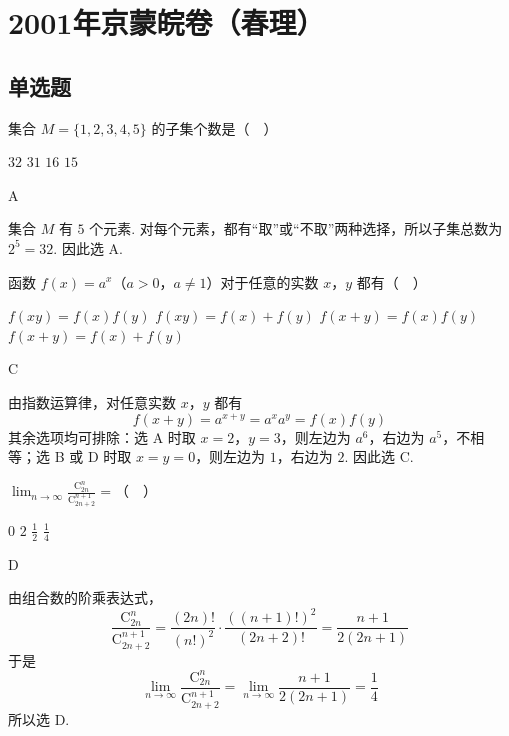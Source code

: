 \chapter{2001年京蒙皖卷（春理）}
\section{单选题}
\begin{problem}
集合 \(M = \{1, 2, 3, 4, 5\}\) 的子集个数是（\(\quad\)）

\choices
    {\(32\)}
    {\(31\)}
    {\(16\)}
    {\(15\)}
\end{problem}

\begin{answer}
A
\end{answer}

\begin{solution}
集合 \(M\) 有 \(5\) 个元素. 对每个元素，都有“取”或“不取”两种选择，所以子集总数为 \(2^{5}=32\). 因此选 A.
\end{solution}

\begin{problem}
函数 \(f(x)=a^x\)（\(a>0\)，\(a\neq1\)）对于任意的实数 \(x\)，\(y\) 都有（\(\quad\)）

\choices
    {\(f(xy) = f(x)f(y)\)}
    {\(f(xy) = f(x) + f(y)\)}
    {\(f(x + y) = f(x)f(y)\)}
    {\(f(x + y) = f(x) + f(y)\)}
\end{problem}

\begin{answer}
C
\end{answer}

\begin{solution}
由指数运算律，对任意实数 \(x\)，\(y\) 都有
\[
f(x+y)=a^{x+y}=a^xa^y=f(x)f(y)
\]
其余选项均可排除：选 A 时取 \(x=2\)，\(y=3\)，则左边为 \(a^6\)，右边为 \(a^5\)，不相等；选 B 或 D 时取 \(x=y=0\)，则左边为 \(1\)，右边为 \(2\). 因此选 C.
\end{solution}

\begin{problem}
\(\displaystyle\lim_{n\to\infty}\frac{\mathrm C_{2n}^{n}}{\mathrm C_{2n+2}^{n+1}}=\)（\(\quad\)）

\choices
    {\(0\)}
    {\(2\)}
    {\( \frac{1}{2} \)}
    {\(\frac{1}{4}\)}
\end{problem}

\begin{answer}
D
\end{answer}

\begin{solution}
由组合数的阶乘表达式，
\[
\frac{\mathrm C_{2n}^{n}}{\mathrm C_{2n+2}^{n+1}}=\frac{(2n)!}{(n!)^2}\cdot\frac{((n+1)!)^2}{(2n+2)!}=\frac{n+1}{2(2n+1)}
\]
于是
\[
\lim_{n\to\infty}\frac{\mathrm C_{2n}^{n}}{\mathrm C_{2n+2}^{n+1}}=\lim_{n\to\infty}\frac{n+1}{2(2n+1)}=\frac14
\]
所以选 D.
\end{solution}

